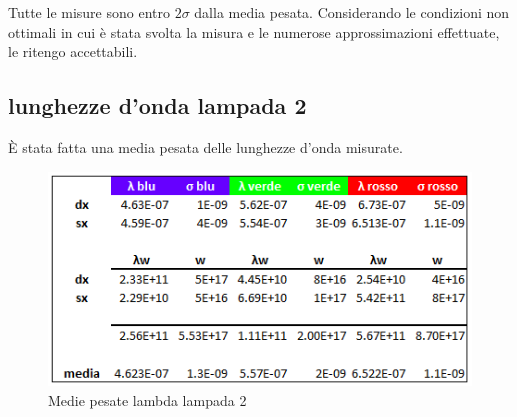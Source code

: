 \documentclass{article}
\begin{document}
Tutte le misure sono entro $2\sigma$ dalla media pesata. Considerando le condizioni non ottimali in cui è stata svolta la misura e le numerose approssimazioni effettuate, le ritengo accettabili.

\clearpage

\subsection{lunghezze d'onda lampada 2}

È stata fatta una media pesata delle lunghezze d'onda misurate.

\begin{figure}[h!]
  \centering
  \includegraphics[width=0.6\linewidth]{IM tab_lambda_2}
  \caption{Medie pesate lambda lampada 2}
\end{figure}
\end{document}
